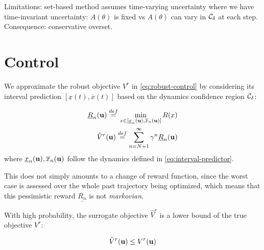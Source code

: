 \documentclass{article}
\begin{document}

Limitations: set-based method assumes time-varying uncertainty where we have time-invariant uncertainty: $A(\theta)$ is fixed vs $A(\theta)$ can vary in $\mathcal{C}_\delta$ at each step. Consequence: conservative overset.

\section{Control}

\label{sec:control}

\begin{definition}
We approximate the robust objective $V^r$ in \eqref{eq:robust-control} by considering its interval prediction $[\underline{x}(t), \overline{x}(t)]$ based on the dynamics confidence region $\mathcal{C}_\delta$:

\begin{align}
\underline{R}_n(\mathbf{u}) \stackrel{def}{=} \min_{x\in[\underline{x}_n(\mathbf{u}), \overline{x}_n(\mathbf{u})]}  R(x) \label{eq:pessimistic-rewards} \\
\hat{V}^r(\mathbf{u}) \stackrel{def}{=} \sum_{n=N+1}^\infty \gamma^n \underline{R}_n(\mathbf{u}) \label{eq:surrogate_objective}
\end{align}
where $\underline{x}_n(\mathbf{u}), \overline{x}_n(\mathbf{u})$ follow the dynamics defined in \eqref{eq:interval-predictor}.
\end{definition}

This does not simply amounts to a change of reward function, since the worst case is assessed over the whole past trajectory being optimized, which means that this pessimistic reward $\underline{R_n}$ is not \emph{markovian}.

\begin{proposition}
\label{prop:lower-bound}
With high probability, the surrogate objective $\hat{V}^r$ is a lower bound of the true objective $V^r$:

\begin{equation}
\hat{V}^r(\mathbf{u}) \leq V^r(\mathbf{u})
\end{equation}
\end{proposition}
\end{document}
